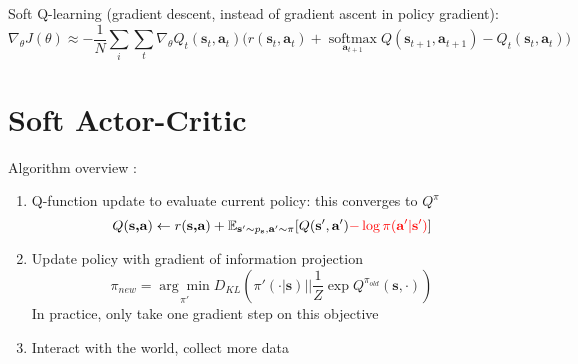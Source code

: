Soft Q-learning (gradient descent, instead of gradient ascent in policy gradient):
\begin{equation}
	\nabla_\theta J(\theta) \approx - \frac{1}{N} \sum_i \sum_t \nabla_\theta Q_t(\textbf{s}_t, \textbf{a}_t) \big( r(\textbf{s}_t, \textbf{a}_t) + \underset{\textbf{a}_{t+1}}{\text{soft}\max} Q(\textbf{s}_{t+1}, \textbf{a}_{t+1}) - Q_t(\textbf{s}_t, \textbf{a}_t)\big)
\end{equation}

\section{Soft Actor-Critic}
Algorithm overview \cite{haarnoja2018soft}:
\begin{enumerate}
	\item Q-function update to evaluate current policy: this converges to $Q^\pi$
	\begin{equation}
		Q(\textbf{s,a}) \leftarrow r(\textbf{s,a}) + \mathbb{E}_{\textbf{s}' \sim p_\textbf{s}, \textbf{a}' \sim \pi} [Q(\textbf{s}', \textbf{a}') {\color{red} - \log \pi(\textbf{a}' | \textbf{s}')}]
	\end{equation}
	\item Update policy with gradient of information projection
	\begin{equation}
		\pi_{new} = \underset{\pi'}{\arg\min} D_{KL} \left( \pi'(\cdot | \textbf{s}) \Big|\Big| \frac{1}{Z} \exp Q^{\pi_{old}}(\textbf{s}, \cdot) \right)
	\end{equation}
	In practice, only take one gradient step on this objective
	\item Interact with the world, collect more data
\end{enumerate}

